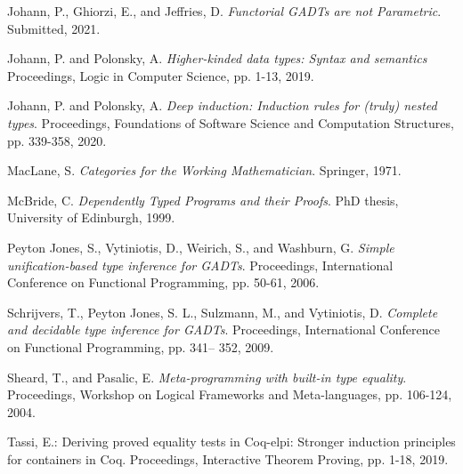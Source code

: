 \documentclass[9pt]{entcs}
\begin{document}
\begin{thebibliography}{10}
 Johann, P., Ghiorzi, E., and Jeffries, D. {\em
  Functorial GADTs are not Parametric}. Submitted, 2021.

 Johann, P. and Polonsky, A. {\em Higher-kinded data
  types: Syntax and semantics} Proceedings, Logic in Computer Science,
  pp. 1-13, 2019.

 Johann, P. and Polonsky, A. {\em Deep induction:
  Induction rules for (truly) nested types}.  Proceedings, Foundations
  of Software Science and Computation Structures, pp. 339-358, 2020.

 MacLane, S. {\em Categories for the Working
  Mathematician}. Springer, 1971.

 McBride, C. {\em Dependently Typed Programs and their
  Proofs}. PhD thesis, University of Edinburgh, 1999.




 Peyton Jones, S., Vytiniotis, D., Weirich, S., and
  Washburn, G. {\em Simple unification-based type inference for
    GADTs}. Proceedings, International Conference on Functional
  Programming, pp. 50-61, 2006. 


 Schrijvers, T., Peyton Jones, S. L., Sulzmann, M., and
  Vytiniotis, D. {\em Complete and decidable type inference for
    GADTs}. Proceedings, International Conference on Functional
  Programming, pp. 341– 352, 2009.

 Sheard, T., and Pasalic, E. {\em Meta-programming with
  built-in type equality}. Proceedings, Workshop on Logical Frameworks
  and Meta-languages, pp. 106-124, 2004. 

 Tassi, E.: Deriving proved equality tests in Coq-elpi:
  Stronger induction principles for containers in Coq. Proceedings,
  Interactive Theorem Proving, pp. 1-18, 2019.
  

\end{thebibliography}
\end{document}

